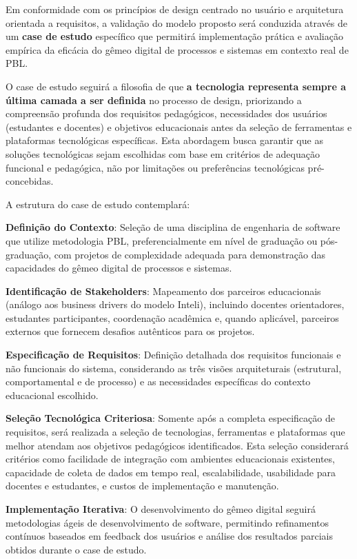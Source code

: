 \documentclass[12pt,a4paper]{article}
\begin{document}
Em conformidade com os princípios de design centrado no usuário e arquitetura orientada a requisitos, a validação do modelo proposto será conduzida através de um \textbf{case de estudo} específico que permitirá implementação prática e avaliação empírica da eficácia do gêmeo digital de processos e sistemas em contexto real de PBL.

O case de estudo seguirá a filosofia de que \textbf{a tecnologia representa sempre a última camada a ser definida} no processo de design, priorizando a compreensão profunda dos requisitos pedagógicos, necessidades dos usuários (estudantes e docentes) e objetivos educacionais antes da seleção de ferramentas e plataformas tecnológicas específicas. Esta abordagem busca garantir que as soluções tecnológicas sejam escolhidas com base em critérios de adequação funcional e pedagógica, não por limitações ou preferências tecnológicas pré-concebidas.

A estrutura do case de estudo contemplará:

\textbf{Definição do Contexto}: Seleção de uma disciplina de engenharia de software que utilize metodologia PBL, preferencialmente em nível de graduação ou pós-graduação, com projetos de complexidade adequada para demonstração das capacidades do gêmeo digital de processos e sistemas.

\textbf{Identificação de Stakeholders}: Mapeamento dos parceiros educacionais (análogo aos business drivers do modelo Inteli), incluindo docentes orientadores, estudantes participantes, coordenação acadêmica e, quando aplicável, parceiros externos que fornecem desafios autênticos para os projetos.

\textbf{Especificação de Requisitos}: Definição detalhada dos requisitos funcionais e não funcionais do sistema, considerando as três visões arquiteturais (estrutural, comportamental e de processo) e as necessidades específicas do contexto educacional escolhido.

\textbf{Seleção Tecnológica Criteriosa}: Somente após a completa especificação de requisitos, será realizada a seleção de tecnologias, ferramentas e plataformas que melhor atendam aos objetivos pedagógicos identificados. Esta seleção considerará critérios como facilidade de integração com ambientes educacionais existentes, capacidade de coleta de dados em tempo real, escalabilidade, usabilidade para docentes e estudantes, e custos de implementação e manutenção.

\textbf{Implementação Iterativa}: O desenvolvimento do gêmeo digital seguirá metodologias ágeis de desenvolvimento de software, permitindo refinamentos contínuos baseados em feedback dos usuários e análise dos resultados parciais obtidos durante o case de estudo.
\end{document}
